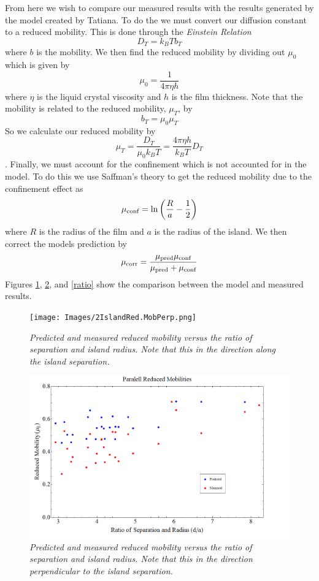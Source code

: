 \documentclass[11pt]{article}
\begin{document}
From here we wish to compare our measured results with the results generated by the model created by Tatiana. To do the we must convert our diffusion constant to a reduced mobility. This is done through the \emph{Einstein Relation}
\begin{equation}
D_T = k_BTb_T
\end{equation}
where $b$ is the mobility. We then find the reduced mobility by dividing out $\mu_0$ which is given by
$$\mu_0 = \frac{1}{4\pi\eta h}$$
where $\eta$ is the liquid crystal viscosity and $h$ is the film thickness. Note that the mobility is related to the reduced mobility, $\mu_T$, by
$$b_T = \mu_0\mu_T$$
So we calculate our reduced mobility by
$$\mu_T = \frac{D_T}{\mu_0k_BT} = \frac{4\pi\eta h}{k_BT}D_T$$.
Finally, we must account for the confinement which is not accounted for in the model. To do this we use Saffman's theory to get the reduced mobility due to the confinement effect as
$$\mu_{\textnormal{conf}} = \ln\left(\frac{R}{a}-\frac{1}{2}\right)$$
where $R$ is the radius of the film and $a$ is the radius of the island. We then correct the models prediction by 
$$\mu_{\textnormal{corr}} = \frac{\mu_{\textnormal{pred}}\mu_{\textnormal{conf}}}{\mu_{\textnormal{pred}}+\mu_{\textnormal{conf}}}$$
Figures \ref{RedMobd}, \ref{RedMobtau}, and \ref{ratio} show the comparison between the model and measured results.

\begin{figure}
\centering
\texttt{[image: Images/2IslandRed.MobPerp.png]}
\caption{\textit{Predicted and measured reduced mobility versus the ratio of separation and island radius. Note that this in the direction along the island separation.}}
\label{RedMobd}
\end{figure}

\begin{figure}
\centering
\includegraphics[scale=0.4]{Images/2IslandRedMobPara.png}
\caption{\textit{Predicted and measured reduced mobility versus the ratio of separation and island radius. Note that this in the direction perpendicular to the island separation.}}
\label{RedMobtau}
\end{figure}
\end{document}
